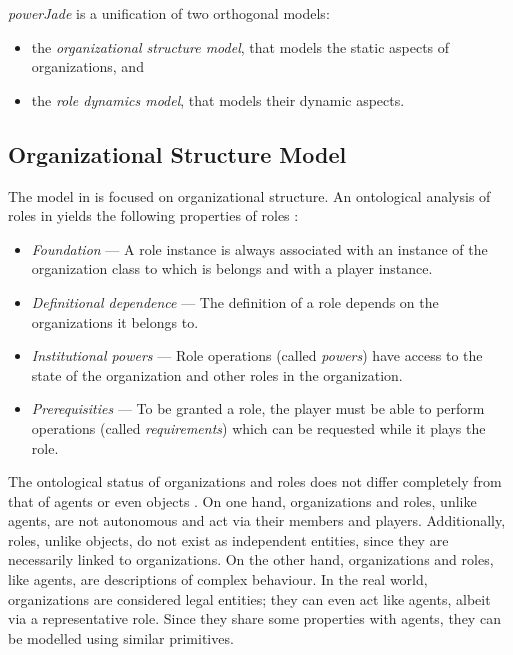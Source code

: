 \textit{powerJade} is a unification of two orthogonal models:
\begin{itemize}
	\item the \textit{organizational structure model}, that models the static aspects of organizations, and
	\item the \textit{role dynamics model}, that models their dynamic aspects.
\end{itemize}

\subsection*{Organizational Structure Model}

The model in \cite{Boella04} is focused on organizational structure.
An ontological analysis of roles in yields the following properties of roles \cite{Boella04}:
\begin{itemize} %
	\item \textit{Foundation} --- A role instance is always associated with an instance of the organization class to which is belongs and with a player instance.
	\item \textit{Definitional dependence} --- The definition of a role depends on the organizations it belongs to.
	\item \textit{Institutional powers} --- Role operations (called \textit{powers}) have access to the state of the organization and other roles in the organization.
	\item \textit{Prerequisities} --- To be granted a role, the player must be able to perform operations (called \textit{requirements}) which can be requested while it plays the role.
\end{itemize}

The ontological status of organizations and roles does not differ completely from that of agents or even objects \cite{Boella04}.
On one hand, organizations and roles, unlike agents, are not autonomous and act via their members and players.
Additionally, roles, unlike objects, do not exist as independent entities, since they are necessarily linked to organizations.
On the other hand, organizations and roles, like agents, are descriptions of complex behaviour.
In the real world, organizations are considered legal entities; they can even act like agents, albeit via a representative role.
Since they share some properties with agents, they can be modelled using similar primitives.

